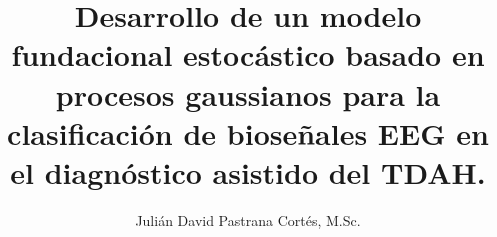 \usepackage[es-tabla]{babel}
\usepackage{parskip}
\usepackage[capitalise, noabbrev]{cleveref}



\title{
	Desarrollo de un modelo fundacional estocástico basado en procesos gaussianos para la clasificación de bioseñales EEG en el diagnóstico asistido del TDAH.
	}
\author{
	Julián David Pastrana Cortés, M.Sc.
	}


\date{}